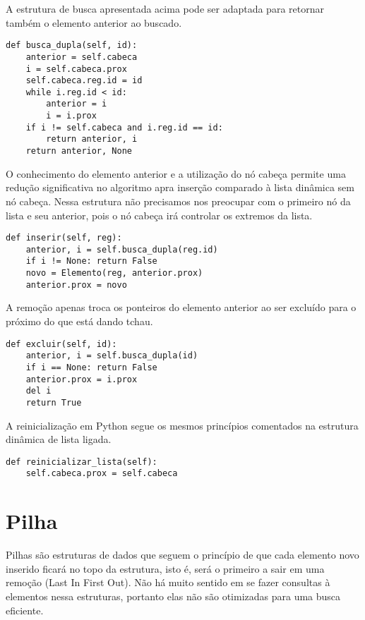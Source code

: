 \documentclass[a4paper, twocolumn]{article}
\theoremstyle{definition}
\begin{document}
A estrutura de busca apresentada acima pode ser adaptada para retornar também o elemento anterior ao buscado.
\begin{lstlisting}[label=lista_ligada_circ_busca_dupla, caption= Lista Ligada circular (busca anterior e atual)]
def busca_dupla(self, id):
    anterior = self.cabeca
    i = self.cabeca.prox
    self.cabeca.reg.id = id
    while i.reg.id < id:
        anterior = i
        i = i.prox
    if i != self.cabeca and i.reg.id == id: 
        return anterior, i
    return anterior, None
\end{lstlisting}

O conhecimento do elemento anterior e a utilização do nó cabeça permite uma redução significativa no algoritmo apra inserção comparado à lista dinâmica sem nó cabeça. Nessa estrutura não precisamos nos preocupar com o primeiro nó da lista e seu anterior, pois o nó cabeça irá controlar os extremos da lista.
\begin{lstlisting}[label=lista_ligada_circ_inserir, caption= Lista Ligada circular (inserção)]
def inserir(self, reg):
    anterior, i = self.busca_dupla(reg.id)
    if i != None: return False
    novo = Elemento(reg, anterior.prox)
    anterior.prox = novo
\end{lstlisting}

A remoção apenas troca os ponteiros do elemento anterior ao ser excluído para o próximo do que está dando tchau.
\begin{lstlisting}[label=lista_ligada_circ_excluir, caption= Lista Ligada circular (remoção)]
def excluir(self, id):
    anterior, i = self.busca_dupla(id)
    if i == None: return False
    anterior.prox = i.prox
    del i
    return True
\end{lstlisting}

A reinicialização em Python segue os mesmos princípios comentados na estrutura dinâmica de lista ligada.
\begin{lstlisting}[label=lista_ligada_circ_reinicializar, caption= Lista Ligada circular (reinicialização)]
def reinicializar_lista(self):
    self.cabeca.prox = self.cabeca
\end{lstlisting}

\section{Pilha}
Pilhas são estruturas de dados que seguem o princípio de que cada elemento novo inserido ficará no topo da estrutura, isto é, será o primeiro a sair em uma remoção (Last In First Out). Não há muito sentido em se fazer consultas à elementos nessa estruturas, portanto elas não são otimizadas para uma busca eficiente.
\end{document}
